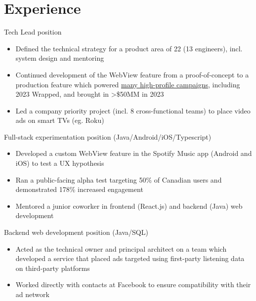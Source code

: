



\makecvtitle


\section{Experience}
	{Tech Lead position}{
	\begin{itemize}
	\item Defined the technical strategy for a product area of 22 (13 engineers), incl. system design and mentoring
	\item Continued development of the WebView feature from a proof-of-concept to a production feature which powered \textcolor{color1}{\href{https://newsroom.spotify.com/2023-10-18/spotifys-interactive-experiences-create-the-magic-of-wrapped-year-round/}{many high-profile campaigns}}, including 2023 Wrapped, and brought in >\$50MM in 2023
	\item Led a company priority project (incl. 8 cross-functional teams) to place video ads on smart TVs (eg. Roku)
	\end{itemize}
	}
	{Full-stack experimentation position (Java/Android/iOS/Typescript)}{
	\begin{itemize}
	\item Developed a custom WebView feature in the Spotify Music app (Android and iOS) to test a UX hypothesis
	\item Ran a public-facing alpha test targeting 50\% of Canadian users and demonstrated 178\% increased engagement
	\item Mentored a junior coworker in frontend (React.js) and backend (Java) web development
	\end{itemize}
	}
	{Backend web development position (Java/SQL)}{
	\begin{itemize}
	\item Acted as the technical owner and principal architect on a team which developed a service that placed ads targeted using first-party listening data on third-party platforms
	\item Worked directly with contacts at Facebook to ensure compatibility with their ad network
	\end{itemize}
}

